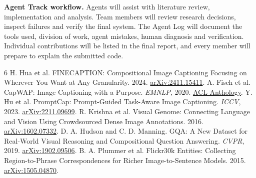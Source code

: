 \documentclass[11pt,twocolumn]{article}
\begin{document}
\textbf{Agent Track workflow.} Agents will assist with literature review,
implementation and analysis. Team members will review research decisions,
inspect failures and verify the final system. The Agent Log will document the
tools used, division of work, agent mistakes, human diagnosis and verification.
Individual contributions will be listed in the final report, and every member
will prepare to explain the submitted code.

\begin{thebibliography}{6}
\small
{} H. Hua et al. FINECAPTION: Compositional Image Captioning
Focusing on Wherever You Want at Any Granularity. 2024.
\href{https://arxiv.org/abs/2411.15411}{arXiv:2411.15411}.
 A. Fisch et al. CapWAP: Image Captioning with a Purpose.
\emph{EMNLP}, 2020.
\href{https://aclanthology.org/2020.emnlp-main.705/}{ACL Anthology}.
 Y. Hu et al. PromptCap: Prompt-Guided Task-Aware Image
Captioning. \emph{ICCV}, 2023.
\href{https://arxiv.org/abs/2211.09699}{arXiv:2211.09699}.
 R. Krishna et al. Visual Genome: Connecting Language and Vision
Using Crowdsourced Dense Image Annotations. 2016.
\href{https://arxiv.org/abs/1602.07332}{arXiv:1602.07332}.
 D. A. Hudson and C. D. Manning. GQA: A New Dataset for Real-World
Visual Reasoning and Compositional Question Answering. \emph{CVPR}, 2019.
\href{https://arxiv.org/abs/1902.09506}{arXiv:1902.09506}.
 B. A. Plummer et al. Flickr30k Entities: Collecting Region-to-Phrase
Correspondences for Richer Image-to-Sentence Models. 2015.
\href{https://arxiv.org/abs/1505.04870}{arXiv:1505.04870}.
\end{thebibliography}
\end{document}

